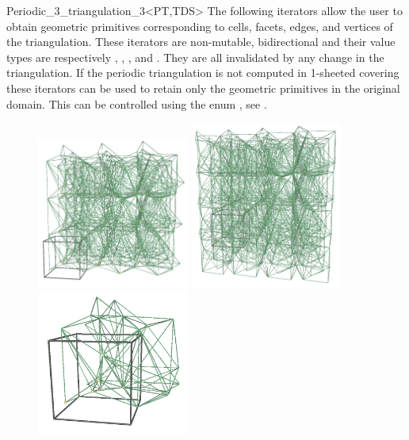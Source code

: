 \begin{ccRefClass}{Periodic_3_triangulation_3<PT,TDS>}
The following iterators allow the user to obtain geometric primitives
corresponding to cells, facets, edges, and vertices of the
triangulation.
These iterators are non-mutable, bidirectional and their value types
are respectively , ,
, and . They are all
invalidated by any change in the triangulation. If the periodic
triangulation is not computed in 1-sheeted covering these iterators
can be used to retain only the geometric primitives in the original
domain. This can be controlled using the enum , see
. 

\begin{figure}[htbp]
\begin{ccTexOnly}
\begin{center} 
\includegraphics[width=5cm]{Periodic_3_triangulation_3_ref/it_STORED} 
\includegraphics[width=5cm]{Periodic_3_triangulation_3_ref/it_STORED_COVER_DOMAIN}\\
\includegraphics[width=5cm]{Periodic_3_triangulation_3_ref/it_UNIQUE} 

\end{center}
\end{ccTexOnly}
\end{figure}
\end{ccRefClass}
